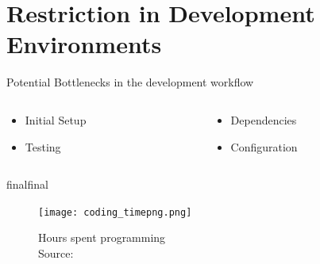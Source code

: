 \documentclass{beamer}
\def\final{final}
\def\status{final}
\begin{document}
\section{Restriction in Development Environments}
\begin{frame}{}
  \begin{center}
    \large{\color{uos-red-full} Potential Bottlenecks in the development workflow}
    \normalsize
    \vspace{0.5cm}
    \begin{columns}[totalwidth=\textwidth]
      \begin{column}{0.4\textwidth}
        \begin{itemize}
          \item Initial Setup
          \item Testing
        \end{itemize}
      \end{column}
      \begin{column}{0.4\textwidth}
        \begin{itemize}
          \item Dependencies
          \item Configuration
        \end{itemize}
      \end{column}
    \end{columns}
  \end{center}

  \ifx\status\final{}
    \pause{}
  \fi

  \begin{figure}
    \texttt{[image: coding\_timepng.png]}
    \caption{\footnotesize Hours spent programming \\\textcolor{uos-grey-full}{Source: {\cite{setuppain}}}}
  \end{figure}
\end{frame}
\end{document}
